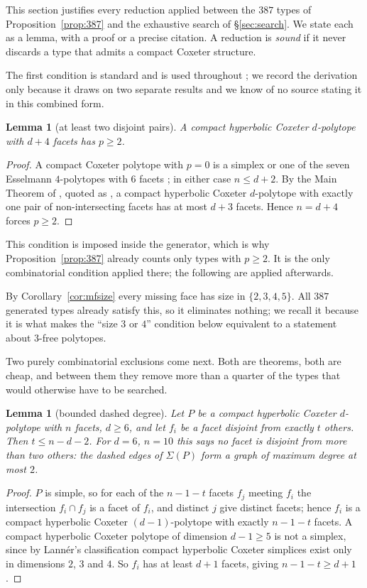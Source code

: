 \documentclass[11pt,reqno]{amsart}
\theoremstyle{plain}
\newtheorem{lemma}[theorem]{Lemma}
\theoremstyle{definition}
\newcommand{\NumTypes}{387}
\begin{document}
This section justifies every reduction applied between the $\NumTypes$ types of
Proposition~\ref{prop:387} and the exhaustive search of \S\ref{sec:search}. We
state each as a lemma, with a proof or a precise citation. A reduction is
\emph{sound} if it never discards a type that admits a compact Coxeter
structure.

The first condition is standard and is used throughout \cite{Burcroff2024}; we
record the derivation only because it draws on two separate results and we know
of no source stating it in this combined form.

\begin{lemma}[at least two disjoint pairs]
\label{lem:p2}
A compact hyperbolic Coxeter $d$-polytope with $d+4$ facets has $p\ge 2$.
\end{lemma}
\begin{proof}
A compact Coxeter polytope with $p=0$ is a simplex or one of the seven
Esselmann $4$-polytopes with $6$ facets
\cite[Thm.~A]{FeliksonTumarkin2008}; in either case $n\le d+2$. By the Main
Theorem of \cite{FeliksonTumarkin2009}, quoted as
\cite[Thm.~5.1]{Burcroff2024}, a compact hyperbolic Coxeter $d$-polytope with
exactly one pair of non-intersecting facets has at most $d+3$ facets. Hence
$n=d+4$ forces $p\ge2$.
\end{proof}

This condition is imposed inside the generator, which is why
Proposition~\ref{prop:387} already counts only types with $p\ge2$. It is the
only combinatorial condition applied there; the following are applied
afterwards.

By Corollary~\ref{cor:mfsize} every missing face has size in $\{2,3,4,5\}$. All
$\NumTypes$ generated types already satisfy this, so it eliminates nothing; we
recall it because it is what makes the ``size $3$ or $4$'' condition below
equivalent to a statement about $3$-free polytopes.

Two purely combinatorial exclusions come next. Both are theorems, both are cheap,
and between them they remove more than a quarter of the types that would otherwise
have to be searched.

\begin{lemma}[bounded dashed degree]
\label{lem:degree}
Let $P$ be a compact hyperbolic Coxeter $d$-polytope with $n$ facets, $d\ge6$, and
let $f_i$ be a facet disjoint from exactly $t$ others. Then $t\le n-d-2$. For
$d=6$, $n=10$ this says no facet is disjoint from more than two others: the dashed
edges of $\Sigma(P)$ form a graph of maximum degree at most $2$.
\end{lemma}
\begin{proof}
$P$ is simple, so for each of the $n-1-t$ facets $f_j$ meeting $f_i$ the
intersection $f_i\cap f_j$ is a facet of $f_i$, and distinct $j$ give distinct
facets; hence $f_i$ is a compact hyperbolic Coxeter $(d-1)$-polytope with exactly
$n-1-t$ facets. A compact hyperbolic Coxeter polytope of dimension $d-1\ge5$ is not
a simplex, since by Lann\'er's classification \cite{Lanner1950} compact hyperbolic
Coxeter simplices exist only in dimensions $2$, $3$ and $4$. So $f_i$ has at least
$d+1$ facets, giving $n-1-t\ge d+1$.
\end{proof}
\end{document}
